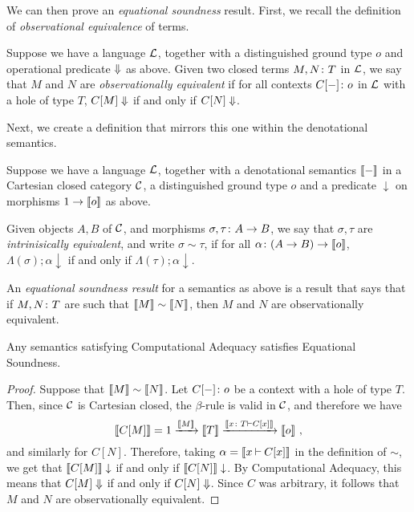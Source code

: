\documentclass[11pt]{report}
\begin{document}
We can then prove an \emph{equational soundness} result.
First, we recall the definition of \emph{observational equivalence} of terms.

\begin{definition}
  Suppose we have a language $\mathcal L$, together with a distinguished ground type $o$ and operational predicate $\Downarrow$ as above.  
  Given two closed terms $M,N\colon T$ in $\mathcal L$, we say that $M$ and $N$ are \emph{observationally equivalent} if for all contexts $C[-]\colon o$ in $\mathcal L$ with a hole of type $T$, $C[M]\Downarrow$ if and only if $C[N] \Downarrow$.
\end{definition}

Next, we create a definition that mirrors this one within the denotational semantics.

\begin{definition}
  Suppose we have a language $\mathcal L$, together with a denotational semantics $\left\llbracket-\right\rrbracket$ in a Cartesian closed category ${\mathcal{C}}$, a distinguished ground type $o$ and a predicate $\downarrow$ on morphisms $1 \to \left\llbracket o\right\rrbracket$ as above.  

  Given objects $A,B$ of ${\mathcal{C}}$, and morphisms $\sigma,\tau\colon A \to B$, we say that $\sigma,\tau$ are \emph{intrinisically equivalent}, and write $\sigma\sim\tau$, if for all $\alpha\colon (A \to B) \to \left\llbracket o\right\rrbracket$, $\Lambda(\sigma);\alpha\downarrow$ if and only if $\Lambda(\tau);\alpha\downarrow$.
\end{definition}

\begin{definition}
  An \emph{equational soundness result} for a semantics as above is a result that says that if $M,N\colon T$ are such that $\left\llbracket M\right\rrbracket\sim\left\llbracket N\right\rrbracket$, then $M$ and $N$ are observationally equivalent.
\end{definition}

\begin{proposition}
  Any semantics satisfying Computational Adequacy satisfies Equational Soundness.
  \label{PropEquationalSoundness}
\end{proposition}
\begin{proof}
  Suppose that $\left\llbracket M\right\rrbracket\sim\left\llbracket N\right\rrbracket$.  
  Let $C[-]\colon o$ be a context with a hole of type $T$.
  Then, since ${\mathcal{C}}$ is Cartesian closed, the $\beta$-rule is valid in ${\mathcal{C}}$, and therefore we have
  \[
    \left\llbracket C[M]\right\rrbracket = 1 \xrightarrow{\left\llbracket M\right\rrbracket} \left\llbracket T\right\rrbracket \xrightarrow{\left\llbracket x\colon T\mathbin{\vdash} C[x]\right\rrbracket} \left\llbracket o\right\rrbracket\,,
    \]
  and similarly for $C[N]$.  
  Therefore, taking $\alpha=\left\llbracket x\mathbin{\vdash} C[x]\right\rrbracket$ in the definition of $\sim$, we get that $\left\llbracket C[M]\right\rrbracket\downarrow$ if and only if $\left\llbracket C[N]\right\rrbracket\downarrow$.  
  By Computational Adequacy, this means that $C[M]\Downarrow$ if and only if $C[N]\Downarrow$.  
  Since $C$ was arbitrary, it follows that $M$ and $N$ are observationally equivalent.
\end{proof}
\end{document}
